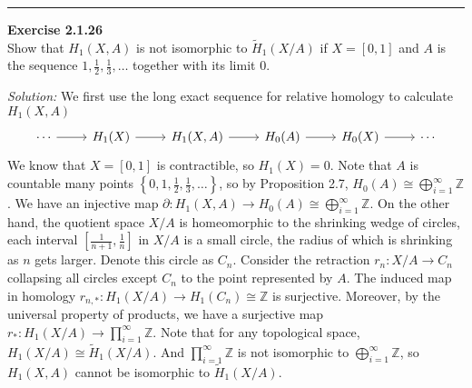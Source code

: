 \documentclass[a4paper, 12pt]{article}
\newenvironment{problem}[2][Exercise]
    { \begin{mdframed}[backgroundcolor=gray!20] \textbf{#1 #2} \\}
    {  \end{mdframed}}
\newenvironment{solution}
    {\textit{Solution:}}
    {}
\begin{document}
\noindent\rule{7in}{2.8pt}
\begin{problem}{2.1.26}
Show that \(H_1(X,A)\) is not isomorphic to \(\tilde{H}_1(X/A)\) if \(X=[0,1]\) and \(A\) is the sequence \(1,\frac{1}{2},\frac{1}{3},\ldots\) together with its limit \(0\).
\end{problem}
\begin{solution}
We first use the long exact sequence for relative homology to calculate \(H_1(X,A)\)
\[\begin{tikzcd}
	\cdots & {H_1(X)} & {H_1(X,A)} & {H_0(A)} & {H_0(X)} & \cdots
	\arrow[from=1-1, to=1-2]
	\arrow[from=1-2, to=1-3]
	\arrow[from=1-3, to=1-4]
	\arrow[from=1-4, to=1-5]
	\arrow[from=1-5, to=1-6]
\end{tikzcd}\]
We know that \(X=[0,1]\) is contractible, so \(H_1(X)=0\). Note that \(A\) is countable many points \(\left\{ 0,1,\frac{1}{2},\frac{1}{3},\ldots \right\}\), so by Proposition 2.7, \(H_0(A)\cong \bigoplus_{i=1}^\infty \mathbb{Z}\). We have an injective map \(\partial:H_1(X,A)\rightarrow H_0(A)\cong \bigoplus_{i=1}^\infty \mathbb{Z}\). 
On the other hand, the quotient space \(X/A\) is homeomorphic to the shrinking wedge of circles, each interval \([\frac{1}{n+1},\frac{1}{n}]\) in \(X/A\) is a small circle, the radius of which is shrinking as \(n\) gets larger. Denote this circle as \(C_n\). Consider the 
retraction \(r_n:X/A\rightarrow C_n\) collapsing all circles except \(C_n\) to the point represented by \(A\). The induced map in homology \(r_{n,*}:H_1(X/A)\rightarrow H_1(C_n)\cong \mathbb{Z}\) is surjective. Moreover, by the universal property of products, we have a surjective map \(r_*:H_1(X/A)\rightarrow \prod_{i=1}^\infty \mathbb{Z}\). Note that for 
any topological space, \(H_1(X/A)\cong \tilde{H}_1(X/A)\). And \(\prod_{i=1}^\infty \mathbb{Z}\) is not isomorphic to \(\bigoplus_{i=1}^\infty \mathbb{Z}\), so \(H_1(X,A)\) cannot be isomorphic to \(\tilde{H}_1(X/A)\).
\end{solution}
\end{document}
